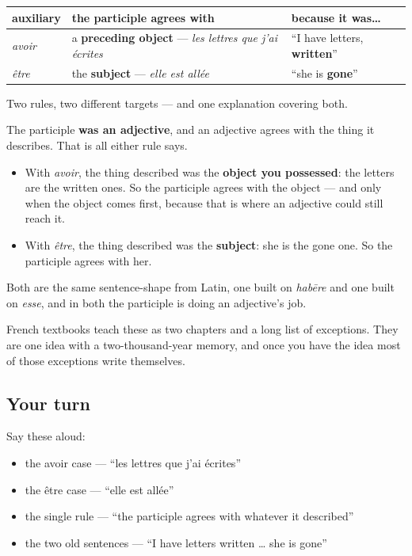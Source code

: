\begin{grammarlens}[title={Grammar Lens: the participle agrees with whatever it described}]
\noindent
\begin{tabularx}{\linewidth}{@{}>{\raggedright\arraybackslash}X>{\raggedright\arraybackslash}X>{\raggedright\arraybackslash}X@{}}
\toprule
\textbf{auxiliary} & \textbf{the participle agrees with} & \textbf{because it was…} \\
\midrule
\emph{avoir} & a \textbf{preceding object} — \emph{les lettres que j'ai écrites} & \textquotedblleft{}I have letters, \textbf{written}\textquotedblright{} \\
\emph{être} & the \textbf{subject} — \emph{elle est allée} & \textquotedblleft{}she is \textbf{gone}\textquotedblright{} \\
\bottomrule
\end{tabularx}

Two rules, two different targets — and one explanation covering both.

The participle \textbf{was an adjective}, and an adjective agrees with the thing it describes. That is all either rule says.

\begin{itemize}
\raggedright
  \item With \emph{avoir}, the thing described was the \textbf{object you possessed}: the letters are the written ones. So the participle agrees with the object — and only when the object comes first, because that is where an adjective could still reach it.
  \item With \emph{être}, the thing described was the \textbf{subject}: she is the gone one. So the participle agrees with her.
\end{itemize}

Both are the same sentence-shape from Latin, one built on \emph{habēre} and one built on \emph{esse}, and in both the participle is doing an adjective's job.

French textbooks teach these as two chapters and a long list of exceptions. They are one idea with a two-thousand-year memory, and once you have the idea most of those exceptions write themselves.
\end{grammarlens}

\subsection*{Your turn}
Say these aloud:

\begin{itemize}
\raggedright
  \item the avoir case — \textquotedblleft{}les lettres que j'ai écrites\textquotedblright{}
  \item the être case — \textquotedblleft{}elle est allée\textquotedblright{}
  \item the single rule — \textquotedblleft{}the participle agrees with whatever it described\textquotedblright{}
  \item the two old sentences — \textquotedblleft{}I have letters written … she is gone\textquotedblright{}
\end{itemize}

